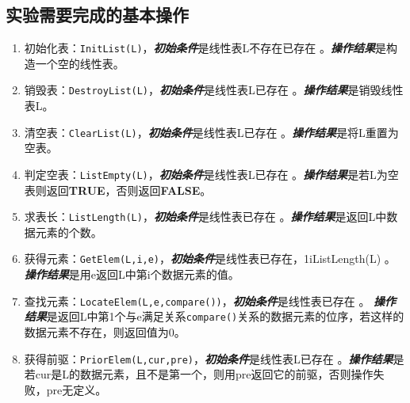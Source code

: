 \subsection{实验需要完成的基本操作}
\begin{enumerate}
\item 初始化表：\texttt{InitList(L)}，\newline \textbf{\emph{初始条件}}是线性表L不存在已存在 。\newline \textbf{\emph{操作结果}}是构造一个空的线性表。
\item 销毁表：\texttt{DestroyList(L)}，\newline \textbf{\emph{初始条件}}是线性表L已存在 。\newline \textbf{\emph{操作结果}}是销毁线性表L。
\item 清空表：\texttt{ClearList(L)}，\newline \textbf{\emph{初始条件}}是线性表L已存在 。\newline \textbf{\emph{操作结果}}是将L重置为空表。
\item 判定空表：\texttt{ListEmpty(L)}，\newline \textbf{\emph{初始条件}}是线性表L已存在 。\newline \textbf{\emph{操作结果}}是若L为空表则返回\textbf{TRUE}，否则返回\textbf{FALSE}。
\item 求表长：\texttt{ListLength(L)}，\newline \textbf{\emph{初始条件}}是线性表已存在 。\newline \textbf{\emph{操作结果}}是返回L中数据元素的个数。
\item 获得元素：\texttt{GetElem(L,i,e)}，\newline \textbf{\emph{初始条件}}是线性表已存在，1\le i\le ListLength(L) 。\newline \textbf{\emph{操作结果}}是用e返回L中第i个数据元素的值。
\item 查找元素：\texttt{LocateElem(L,e,compare())}，\newline \textbf{\emph{初始条件}}是线性表已存在 。\newline
    \textbf{\emph{操作结果}}是返回L中第1个与e满足关系\texttt{compare()}关系的数据元素的位序，若这样的数据元素不存在，则返回值为0。
\item 获得前驱：\texttt{PriorElem(L,cur,pre)}，\newline \textbf{\emph{初始条件}}是线性表L已存在 。\newline \textbf{\emph{操作结果}}是若cur是L的数据元素，且不是第一个，则用pre返回它的前驱，否则操作失败，pre无定义。

\end{enumerate}
